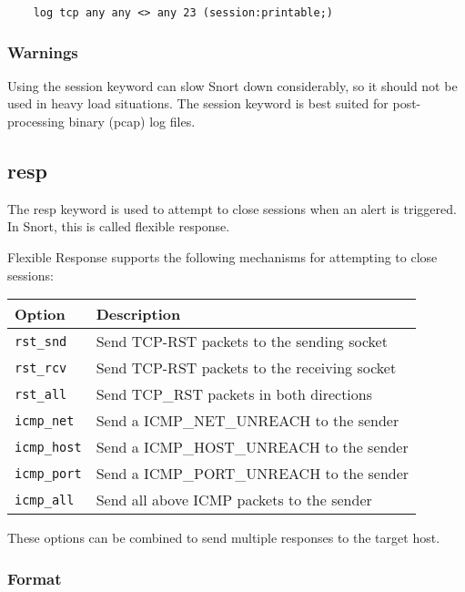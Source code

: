 \documentclass[english]{report}
\begin{document}
\begin{verbatim}
    log tcp any any <> any 23 (session:printable;)
\end{verbatim}

\subsubsection{Warnings}

Using the session keyword can slow Snort down considerably, so it should not be
used in heavy load situations. The session keyword is best suited for
post-processing binary (pcap) log files. 

\subsection{resp}

The resp keyword is used to attempt to close sessions when an alert is
triggered.  In Snort, this is called flexible response.

Flexible Response supports the following mechanisms for attempting to close
sessions:

\begin{center}
\begin{tabular}{| l | l |}
\hline
{\bf Option} & {\bf Description}\\
\hline
\hline
\texttt{rst\_snd} &  Send TCP-RST packets to the sending socket\\
\hline 
\texttt{rst\_rcv} & Send TCP-RST packets to the receiving socket\\
\hline 
\texttt{rst\_all} & Send TCP\_RST packets in both directions\\
\hline 
\texttt{icmp\_net} & Send a ICMP\_NET\_UNREACH to the sender\\
\hline 
\texttt{icmp\_host} & Send a ICMP\_HOST\_UNREACH to the sender\\
\hline 
\texttt{icmp\_port} & Send a ICMP\_PORT\_UNREACH to the sender\\
\hline 
\texttt{icmp\_all} & Send all above ICMP packets to the sender\\
\hline
\end{tabular}
\end{center}

These options can be combined to send multiple responses to the target host.

\subsubsection{Format}
\end{document}
